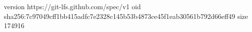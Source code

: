 version https://git-lfs.github.com/spec/v1
oid sha256:7c97049cff1bb415adfc7e2328c145b53b4873ce45f1eab30561b792d66eff49
size 174916
